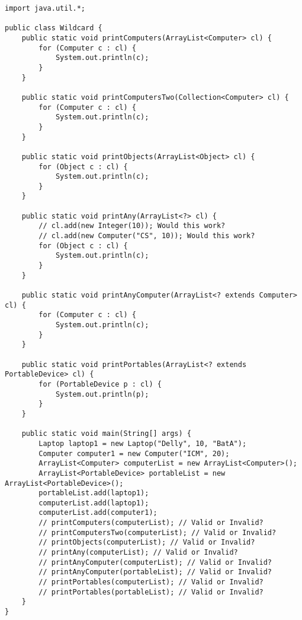 \begin{lstlisting}
import java.util.*;

public class Wildcard {
	public static void printComputers(ArrayList<Computer> cl) {
		for (Computer c : cl) {
			System.out.println(c);
		}
	}

	public static void printComputersTwo(Collection<Computer> cl) {
		for (Computer c : cl) {
			System.out.println(c);
		}
	}

	public static void printObjects(ArrayList<Object> cl) {
		for (Object c : cl) {
			System.out.println(c);
		}
	}

	public static void printAny(ArrayList<?> cl) {
		// cl.add(new Integer(10)); Would this work?
		// cl.add(new Computer("CS", 10)); Would this work?
		for (Object c : cl) {
			System.out.println(c);
		}
	}

	public static void printAnyComputer(ArrayList<? extends Computer> cl) {
		for (Computer c : cl) {
			System.out.println(c);
		}
	}

	public static void printPortables(ArrayList<? extends PortableDevice> cl) {
		for (PortableDevice p : cl) {
			System.out.println(p);
		}
	}

	public static void main(String[] args) {
		Laptop laptop1 = new Laptop("Delly", 10, "BatA");
		Computer computer1 = new Computer("ICM", 20);
		ArrayList<Computer> computerList = new ArrayList<Computer>();
		ArrayList<PortableDevice> portableList = new ArrayList<PortableDevice>();
		portableList.add(laptop1);
		computerList.add(laptop1);
		computerList.add(computer1);
		// printComputers(computerList); // Valid or Invalid?
		// printComputersTwo(computerList); // Valid or Invalid?
		// printObjects(computerList); // Valid or Invalid?
		// printAny(computerList); // Valid or Invalid?
		// printAnyComputer(computerList); // Valid or Invalid?
		// printAnyComputer(portableList); // Valid or Invalid?
		// printPortables(computerList); // Valid or Invalid?
		// printPortables(portableList); // Valid or Invalid?
	}
}
\end{lstlisting}

